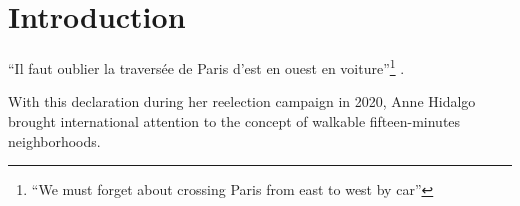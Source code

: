 \documentclass[preprint, 3p,
authoryear]{elsarticle} %
\begin{document}
\section{Introduction}\label{introduction}

``Il faut oublier la traversée de Paris d'est en ouest en
voiture''\footnote{ ``We must forget about crossing Paris from east to
  west by car''} \citep{alimi2020}.

With this declaration during her reelection campaign in 2020, Anne
Hidalgo brought international attention to the concept of walkable
fifteen-minutes neighborhoods.

\citet{knight2018walkable} \citet{liu2022toward}
\citet{pozoukidou2021fifteen} \citet{weng2019fifteen}

\renewcommand\refname{References}

\end{document}
